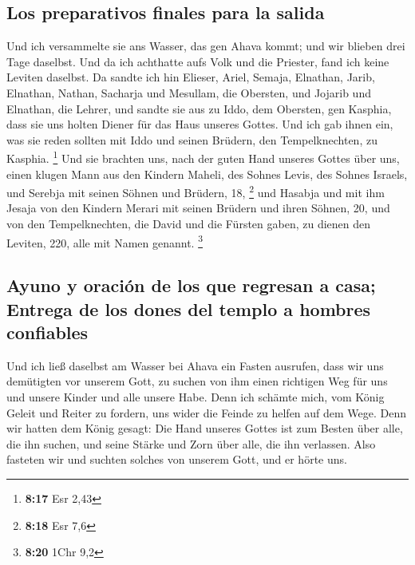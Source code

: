\hypertarget{los-preparativos-finales-para-la-salida}{%
\subsection{Los preparativos finales para la
salida}\label{los-preparativos-finales-para-la-salida}}

 Und ich versammelte sie ans Wasser, das gen Ahava kommt;
und wir blieben drei Tage daselbst. Und da ich achthatte aufs Volk und
die Priester, fand ich keine Leviten daselbst.  Da sandte
ich hin Elieser, Ariel, Semaja, Elnathan, Jarib, Elnathan, Nathan,
Sacharja und Mesullam, die Obersten, und Jojarib und Elnathan, die
Lehrer,  und sandte sie aus zu Iddo, dem Obersten, gen
Kasphia, dass sie uns holten Diener für das Haus unseres Gottes. Und ich
gab ihnen ein, was sie reden sollten mit Iddo und seinen Brüdern, den
Tempelknechten, zu Kasphia. \footnote{\textbf{8:17} Esr 2,43}
 Und sie brachten uns, nach der guten Hand unseres Gottes
über uns, einen klugen Mann aus den Kindern Maheli, des Sohnes Levis,
des Sohnes Israels, und Serebja mit seinen Söhnen und Brüdern, 18,
\footnote{\textbf{8:18} Esr 7,6}  und Hasabja und mit ihm
Jesaja von den Kindern Merari mit seinen Brüdern und ihren Söhnen, 20,
 und von den Tempelknechten, die David und die Fürsten
gaben, zu dienen den Leviten, 220, alle mit Namen genannt. \footnote{\textbf{8:20}
  1Chr 9,2}

\hypertarget{ayuno-y-oraciuxf3n-de-los-que-regresan-a-casa-entrega-de-los-dones-del-templo-a-hombres-confiables}{%
\subsection{Ayuno y oración de los que regresan a casa; Entrega de los
dones del templo a hombres
confiables}\label{ayuno-y-oraciuxf3n-de-los-que-regresan-a-casa-entrega-de-los-dones-del-templo-a-hombres-confiables}}

 Und ich ließ daselbst am Wasser bei Ahava ein Fasten
ausrufen, dass wir uns demütigten vor unserem Gott, zu suchen von ihm
einen richtigen Weg für uns und unsere Kinder und alle unsere Habe.
 Denn ich schämte mich, vom König Geleit und Reiter zu
fordern, uns wider die Feinde zu helfen auf dem Wege. Denn wir hatten
dem König gesagt: Die Hand unseres Gottes ist zum Besten über alle, die
ihn suchen, und seine Stärke und Zorn über alle, die ihn verlassen.
 Also fasteten wir und suchten solches von unserem Gott,
und er hörte uns.


